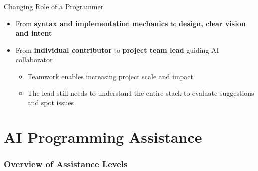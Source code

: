 \documentclass[xcolor=dvipsnames, aspectratio=169]{beamer}
\begin{document}
\begin{frame}{Changing Role of a Programmer}
  \begin{itemize}
    \item<1-> From \textbf{syntax and implementation mechanics} to \textbf{design, clear vision and intent}
    \item<2-> From \textbf{individual contributor} to \textbf{project team lead} guiding AI collaborator
    \begin{itemize}
      \item<2-> Teamwork enables increasing project scale and impact
      \item<2-> The lead still needs to understand the entire stack to evaluate suggestions and spot issues
    \end{itemize}
  \end{itemize}
  
  \vspace{2em}

\end{frame}


\part[AI Programming Assistance]{AI Programming Assistance}
\section{Overview of Assistance Levels}
\end{document}
